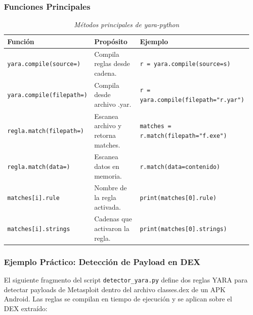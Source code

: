 \documentclass[12pt,a4paper]{article}
\begin{document}
\subsubsection{Funciones Principales}

\begin{table}[H]
\centering\footnotesize
\begin{threeparttable}
\caption{\textit{Métodos principales de yara-python}}
\begin{tabular}{p{5cm}p{3.8cm}p{3.7cm}}
\toprule
\textbf{Función} & \textbf{Propósito} & \textbf{Ejemplo} \\
\midrule
\texttt{yara.compile(source=)} & Compila reglas desde cadena. & \texttt{r = yara.compile(source=s)} \\
\texttt{yara.compile(filepath=)} & Compila desde archivo .yar. & \texttt{r = yara.compile(filepath="r.yar")} \\
\texttt{regla.match(filepath=)} & Escanea archivo y retorna matches. & \texttt{matches = r.match(filepath="f.exe")} \\
\texttt{regla.match(data=)} & Escanea datos en memoria. & \texttt{r.match(data=contenido)} \\
\texttt{matches[i].rule} & Nombre de la regla activada. & \texttt{print(matches[0].rule)} \\
\texttt{matches[i].strings} & Cadenas que activaron la regla. & \texttt{print(matches[0].strings)} \\
\bottomrule
\end{tabular}
\end{threeparttable}
\end{table}

\subsubsection{Ejemplo Práctico: Detección de Payload en DEX}

El siguiente fragmento del script \texttt{detector\_yara.py} define
dos reglas YARA para detectar payloads de Metasploit dentro del archivo
classes.dex de un APK Android. Las reglas se compilan en tiempo de
ejecución y se aplican sobre el DEX extraído:
\end{document}
